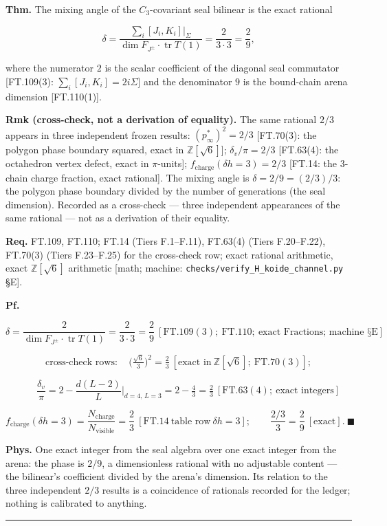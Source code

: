 \begin{theorem}\label{tag:FT-112}
\textbf{Thm.} The mixing angle of the $C_3$-covariant seal bilinear is the exact rational

\[
\delta=\frac{\sum_i[J_i,K_i]\big|_\Sigma}{\dim F_{J^\pm}\cdot\operatorname{tr}T(1)}=\frac{2}{3\cdot3}=\frac29,
\]

where the numerator $2$ is the scalar coefficient of the diagonal seal commutator [FT.109(3): $\sum_i[J_i,K_i]=2i\Sigma$] and the denominator $9$ is the bound-chain arena dimension [FT.110(1)].

\textbf{Rmk (cross-check, not a derivation of equality).} The same rational $2/3$ appears in three independent frozen results: $(p^*_\infty)^2=2/3$ [FT.70(3): the polygon phase boundary squared, exact in $\mathbb Z[\sqrt6]$]; $\delta_v/\pi=2/3$ [FT.63(4): the octahedron vertex defect, exact in $\pi$-units]; $f_{\mathrm{charge}}(\delta h=3)=2/3$ [FT.14: the $3$-chain charge fraction, exact rational]. The mixing angle is $\delta=2/9=(2/3)/3$: the polygon phase boundary divided by the number of generations (the seal dimension). Recorded as a cross-check — three independent appearances of the same rational — not as a derivation of their equality.

\textbf{Req.} FT.109, FT.110; FT.14 (Tiers F.1–F.11), FT.63(4) (Tiers F.20–F.22), FT.70(3) (Tiers F.23–F.25) for the cross-check row; exact rational arithmetic, exact $\mathbb Z[\sqrt6]$ arithmetic [math; machine: \texttt{checks/\allowbreak{}verify\_\allowbreak{}H\_\allowbreak{}koide\_\allowbreak{}channel.py} §E].

\textbf{Pf.}

\[
\delta=\frac{2}{\dim F_{J^\pm}\cdot\operatorname{tr}T(1)}=\frac{2}{3\cdot3}=\frac29\ [\mathrm{FT.109}(3);\ \mathrm{FT.110};\ \text{exact Fractions; machine §E}]
\]

\[
\text{cross-check rows}:\quad\bigl(\tfrac{\sqrt6}3\bigr)^2=\tfrac23\ [\text{exact in}\ \mathbb Z[\sqrt6];\ \mathrm{FT.70}(3)];
\]

\[
\qquad \frac{\delta_v}\pi=2-\frac{d(L-2)}{L}\Big|_{d=4,\,L=3}=2-\tfrac43=\tfrac23\ [\mathrm{FT.63}(4);\ \text{exact integers}]
\]

\[
f_{\mathrm{charge}}(\delta h=3)=\frac{N_{\mathrm{charge}}}{N_{\mathrm{visible}}}=\frac23\ [\mathrm{FT.14}\ \text{table row}\ \delta h=3];\qquad\frac{2/3}{3}=\frac29\ [\text{exact}].\ \blacksquare
\]

\textbf{Phys.} One exact integer from the seal algebra over one exact integer from the arena: the phase is $2/9$, a dimensionless rational with no adjustable content — the bilinear's coefficient divided by the arena's dimension. Its relation to the three independent $2/3$ results is a coincidence of rationals recorded for the ledger; nothing is calibrated to anything.

\vspace{2pt}\noindent\rule{\textwidth}{0.4pt}\vspace{2pt}

\end{theorem}


